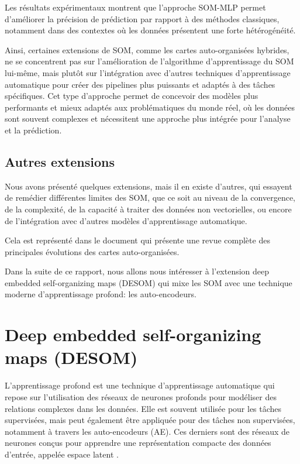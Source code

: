 \documentclass[12pt,a4paper]{report}
\begin{document}
Les résultats expérimentaux montrent que l'approche SOM-MLP permet d'améliorer la précision de prédiction par rapport à des méthodes classiques, 
notamment dans des contextes où les données présentent une forte hétérogénéité.

Ainsi, certaines extensions de SOM, comme les cartes auto-organisées hybrides, ne se concentrent pas sur l'amélioration de l'algorithme d'apprentissage du SOM lui-même,
mais plutôt sur l'intégration avec d'autres techniques d'apprentissage automatique pour créer des pipelines plus puissants et adaptés à des tâches spécifiques.
Cet type d'approche permet de concevoir des modèles plus performants et mieux adaptés aux problématiques du monde réel, 
où les données sont souvent complexes et nécessitent une approche plus intégrée pour l'analyse et la prédiction.


\subsection{Autres extensions}
Nous avons présenté quelques extensions, mais il en existe d'autres, qui essayent de remédier différentes limites des SOM, que ce soit au niveau de la convergence, de la complexité, 
de la capacité à traiter des données non vectorielles, ou encore de l'intégration avec d'autres modèles d'apprentissage automatique.

Cela est représenté dans le document \cite{SurveySOM} qui présente une revue complète des principales évolutions des cartes auto-organisées.

Dans la suite de ce rapport, nous allons nous intéresser à l'extension deep embedded self-organizing maps (DESOM) qui mixe les SOM avec une 
technique moderne d'apprentissage profond: les auto-encodeurs.

\section{Deep embedded self-organizing maps (DESOM)}

L'apprentissage profond est une technique d'apprentissage automatique qui repose sur l'utilisation des réseaux de neurones profonds pour modéliser des relations complexes dans les données.
Elle est souvent utilisée pour les tâches supervisées, mais peut également être appliquée pour des tâches non supervisées, 
notamment à travers les auto-encodeurs (AE). Ces derniers sont des réseaux de neurones conçus pour apprendre une représentation compacte des données d'entrée, appelée espace latent \cite{DESOM}.
\end{document}
